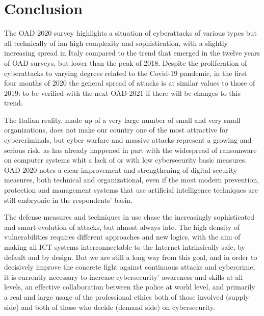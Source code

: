 \documentclass{easychair}
\begin{document}
\section{Conclusion}

The OAD 2020 survey highlights a situation of cyberattacks of various types but all technically of ian high complexity and sophistication, with a slightly increasing 
spread  in Italy  compared to the trend that emerged in the twelve years of OAD surveys, but lower than the peak of 2018. Despite the proliferation of cyberattacks to varying 
degrees related to the Covid-19 pandemic, in the first four months of 2020 the general spread of attacks is at similar values to those of 2019: to be verified with the next OAD 2021
if there will be changes to this trend.


The Italian reality, made up of a very large number of small and very small organizations, does not make our country one of the most attractive for cybercriminals, but cyber warfare
and massive attacks represent a growing and serious risk, as has already happened in part with the widespread of ransomware on computer systems whit a lack of or  with low 
cybersecurity  basic measures. OAD 2020 notes a clear improvement and strengthening of digital security measures, both technical and organizational, even if the most modern 
prevention, protection and management systems that use artificial intelligence techniques are still embryonic  in the respondents' basin.


The defense measures and techniques in use chase the increasingly sophisticated and smart evolution of attacks, but almost always late. The high density of vulnerabilities 
requires different approaches and new logics, with the aim of making all ICT systems interconnectable to the Internet intrinsically safe, by default and by design. But we are 
still a long way from this goal, and in order to decisively improve the concrete fight against continuous attacks and cybercrime, it is currently necessary to increase 
cybersecurity’ awareness and skills at all levels, an effective collaboration between the police at world level, and primarily a real and large usage of the professional ethics
 both of those involved (supply side) and both of those who decide (demand side) on cybersecurity.



\end{document}
